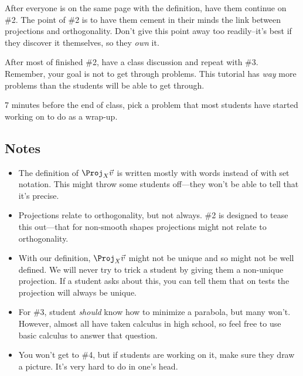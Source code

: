 		After everyone is on the same page with the definition, have them continue on \#2.
		The point of \#2 is to have them cement in their minds the link between projections
		and orthogonality. Don't give this point away too readily--it's best if they discover it themselves, so
		they \emph{own} it.

		After most of finished \#2, have a class discussion and repeat with \#3. Remember, your goal
		is not to get through problems. This tutorial has \emph{way} more problems than the students
		will be able to get through.

		7 minutes before the end of class, pick a problem that most students have started working on
		to do as a wrap-up.

\subsection*{Notes}
	\begin{itemize}
		\item The definition of $\Proj_X\vec v$ is written mostly with words instead of with
			set notation. This might throw some students off---they won't be able to tell that it's precise.
		\item Projections relate to orthogonality, but not always. \#2 is designed to tease this out---that
			for non-smooth shapes projections might not relate to orthogonality.
		\item With our definition, $\Proj_X\vec v$ might not be unique and so might not be well defined. We will
			never try to trick a student by giving them a non-unique projection. If a student asks about
			this, you can tell them that on tests the projection will always be unique.
		\item For \#3, student \emph{should} know how to minimize a parabola, but many won't. However, almost all
			have taken calculus in high school, so feel free to use basic calculus to answer that question.
		\item You won't get to \#4, but if students are working on it, make sure they draw a picture. It's very
			hard to do in one's head.
	\end{itemize}